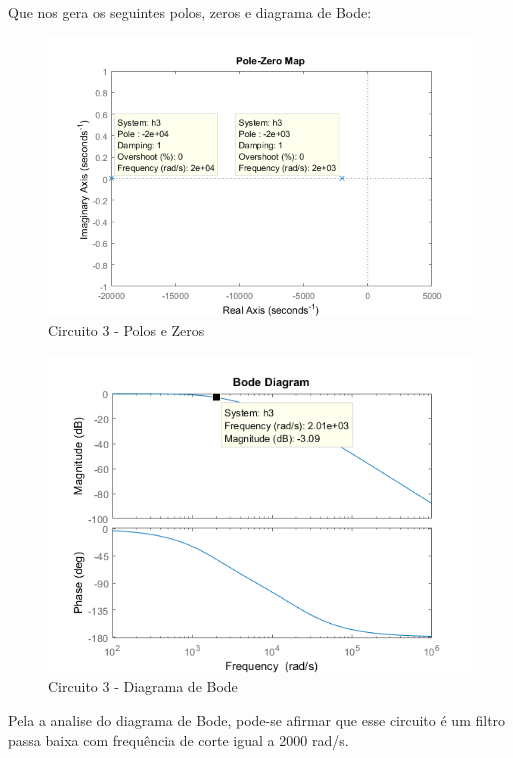\documentclass[a4paper, 12pt]{article}
\begin{document}
			Que nos gera os seguintes polos, zeros e diagrama de Bode:
			\begin{figure}[!ht]
				\centering
				\includegraphics[scale=0.7]{img/1e_circ3.png}
				\caption{Circuito 3 - Polos e Zeros}
			\end{figure}
			\newpage
			\begin{figure}[!ht]
				\centering
				\includegraphics[scale=0.7]{img/1f_circ3.png}
				\caption{Circuito 3 - Diagrama de Bode}
			\end{figure}
			Pela a analise do diagrama de Bode, pode-se afirmar que esse circuito é um filtro passa baixa com frequência de corte igual a 2000 rad/s.
\end{document}
